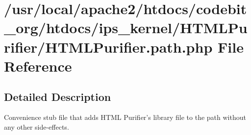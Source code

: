 \hypertarget{_h_t_m_l_purifier_8path_8php}{\section{/usr/local/apache2/htdocs/codebit\-\_\-org/htdocs/ips\-\_\-kernel/\-H\-T\-M\-L\-Purifier/\-H\-T\-M\-L\-Purifier.path.\-php File Reference}
\label{_h_t_m_l_purifier_8path_8php}
}


\subsection{Detailed Description}
Convenience stub file that adds H\-T\-M\-L Purifier's library file to the path without any other side-\/effects. 